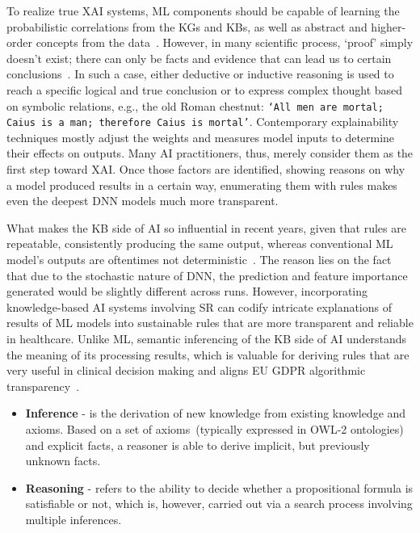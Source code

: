\hspace*{3.5mm} To realize true XAI systems, ML components should be capable of learning the probabilistic correlations from the KGs and KBs, as well as abstract and higher-order concepts from the data~\cite{SAI}. However, in many scientific process, `proof' simply doesn't exist; there can only be facts and evidence that can lead us to certain conclusions~\cite{SAI,tolstoy2005death}. In such a case, either deductive or inductive reasoning is used to reach a specific logical and true conclusion or to express complex thought based on symbolic relations, e.g., the old Roman chestnut: \texttt{`All men are mortal; Caius is a man; therefore Caius is mortal'}. Contemporary explainability techniques mostly adjust the weights and measures model inputs to determine their effects on outputs. Many AI practitioners, thus, merely consider them as the first step toward XAI. Once those factors are identified, showing reasons on why a model produced results in a certain way, enumerating them with rules makes even the deepest DNN models much more transparent. 

\hspace*{3.5mm} What makes the KB side of AI so influential in recent years, given that rules are repeatable, consistently producing the same output, whereas conventional ML model's outputs are oftentimes not deterministic~\cite{alshahrani2017neuro}. The reason lies on the fact that due to the stochastic nature of DNN, the prediction and feature importance generated would be slightly different across runs. However, incorporating knowledge-based AI systems involving SR can codify intricate explanations of results of ML models into sustainable rules that are more transparent and reliable in healthcare. Unlike ML, semantic inferencing of the KB side of AI understands the meaning of its processing results, which is valuable for deriving rules that are very useful in clinical decision making and aligns EU GDPR algorithmic transparency~\cite{kaminski2019right}. 

\begin{itemize}[noitemsep]
    \item \textbf{Inference} - is the derivation of new knowledge from existing knowledge and axioms. Based on a set of axioms~(typically expressed in OWL-2 ontologies) and explicit facts, a reasoner is able to derive implicit, but previously unknown facts. 
    \item \textbf{Reasoning} - refers to the ability to decide whether a propositional formula is satisfiable or not, which is, however, carried out via a search process involving multiple inferences.
\end{itemize}

